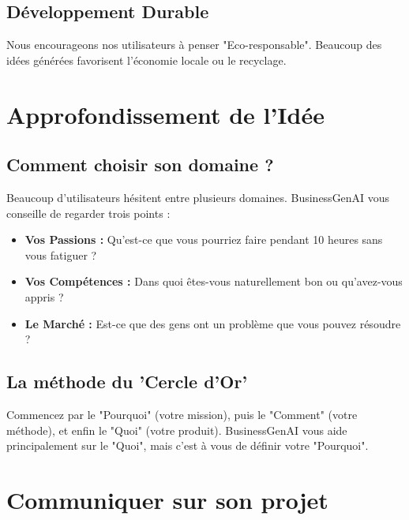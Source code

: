 \documentclass[12pt,a4paper]{report}
\begin{document}
\section{Développement Durable}
Nous encourageons nos utilisateurs à penser "Eco-responsable". Beaucoup des idées générées favorisent l'économie locale ou le recyclage.

\newpage

\chapter{Approfondissement de l'Idée}

\section{Comment choisir son domaine ?}
Beaucoup d'utilisateurs hésitent entre plusieurs domaines. BusinessGenAI vous conseille de regarder trois points :
\begin{itemize}
    \item \textbf{Vos Passions :} Qu'est-ce que vous pourriez faire pendant 10 heures sans vous fatiguer ?
    \item \textbf{Vos Compétences :} Dans quoi êtes-vous naturellement bon ou qu'avez-vous appris ?
    \item \textbf{Le Marché :} Est-ce que des gens ont un problème que vous pouvez résoudre ?
\end{itemize}

\section{La méthode du 'Cercle d'Or'}
Commencez par le "Pourquoi" (votre mission), puis le "Comment" (votre méthode), et enfin le "Quoi" (votre produit). BusinessGenAI vous aide principalement sur le "Quoi", mais c'est à vous de définir votre "Pourquoi".

\newpage

\chapter{Communiquer sur son projet}
\end{document}
